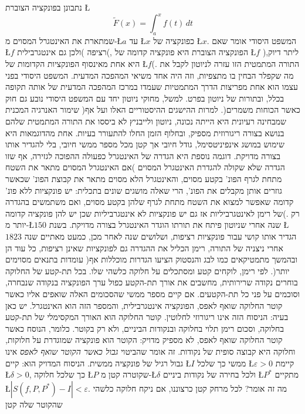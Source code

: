 \documentclass[english,hebrew]{article}
\theoremstyle{remark}
\theoremstyle{definition}
\theoremstyle{plain}
\theoremstyle{remark}
\theoremstyle{plain}
\theoremstyle{plain}
\theoremstyle{definition}
\theoremstyle{plain}
\begin{document}
נתבונן בפונקציה הצוברת \L{%
\[
\tilde{F}(x)=\int_{a}^{x}f(t)\,dt
\]
}%
שמתארת את האינטגרל המסוים מ-\L{$a$} עד \L{$x$} כפונקציה של \L{$x$}.
המשפט היסודי אומר שאם \L{$f$} רציפה )ולכן גם אינטגרבילית(, הפונקציה
הצוברת היא פונקציה קדומה של \L{$f$} )ליתר דיוק, היא אחת מאינסוף הפונקציות
הקדומות של \L{$f$}(. התורה המתמטית הזו עזרה לניוטון לקבל את מה שקפלר
הבחין בו מתצפיות, וזה היה אחד משיאי המהפכה המדעית. המשפט היסודי בפני
עצמו הוא אחת מפריצות הדרך המתמטיות שעמדו במרכז המהפכה המדעית של אותה
תקופה בכלל, ובתורות של ניוטון בפרט. למשל, מחוקי ניוטון יחד עם המשפט
היסודי נובע גם חוק שימור האנרגיה המכנית )כאשר הכוחות משמרים(. למרות
ההישגים ההיסטוריים האלו ועל אף שמבחינה רעיונית היא הייתה נכונה, ניוטון
ולייבניץ לא ביססו את התורה המתמטית שלהם בנושא בצורה ריגורוזית מספיק,
ובחלוף הזמן החלו להתעורר בעיות. אחת מהדוגמאות היא שימוש במושג אינפיניטסימל,
גודל חיובי אך קטן מכל מספר ממשי חיובי, בלי להגדיר אותו בצורה מדויקת.
דוגמה נוספת היא הגדרה של האינטגרל כפעולה ההפוכה לגזירה, אף שזו הגדרה
שלא שקולה להגדרת האינטגרל המסוים )אם האינטגרל המסוים מתאר את השטח
מתחת לגרף הפונ' בקטע מסוים, והאינטגרל הלא מסוים מתאר את קבוצת הפונ'
שכאשר גוזרים אותן מקבלים את הפונ', הרי שאלה מושגים שונים בתכלית: יש
פונקציות ללא פונ' קדומה שאפשר למצוא את השטח מתחת לגרף שלהן בקטע מסוים,
ואם משתמשים בהגדרה של רימן לאינטגרביליות אז גם יש פונקציות לא אינטגרביליות
שכן יש להן פונקציה קדומה(. רק יותר מ-\L{$150$} שנה אחרי שניוטון פיתח
את תורתו הוגדר האינטגרל בצורה מדויקת. בשנת \L{$1823$} הגדיר אותו
קושי עבור פונקציות רציפות, ושלושים שנה לאחר מכן, כמעט מאתיים שנה אחרי
ניצניה של התורה, רימן הכליל את ההגדרה גם לפונקציות שאינן רציפות, כל
עוד הן עומדות בתנאים מסוימים )ובהמשך מתמטיקאים כמו לבג והנסטוק הציעו
הגדרות מוכללות אף יותר(. לפי רימן, לוקחים קטע ומסתכלים על חלוקה כלשהי
שלו. בכל תת-קטע של החלוקה בוחרים נקודה שרירותית, מחשבים את אורך תת-הקטע
כפול ערך הפונקציה בנקודה שנבחרה, וסוכמים על פני כל תת-הקטעים. אם קיים
מספר ממשי שהסכומים האלה שואפים אליו כאשר קוטר החלוקה שואף לאפס, הפונקציה
אינטגרבילית, והמספר הזה הוא האינטגרל. יש כאן בעיה: הניסוח הזה אינו
ריגורוזי לחלוטין. קוטר החלוקה הוא האורך המקסימלי של תת-קטע בחלוקה,
וסכום רימן תלוי בחלוקה ובנקודות הביניים, ולא רק בקוטר. כלומר, הנוסח
כאשר קוטר החלוקה שואף לאפס, לא מספיק מדויק: הקוטר הוא פונקציה שמוגדרת
על חלוקות, וחלוקה היא קבוצה סופית של נקודות. זה אומר שהביטוי \emph{גבול
כאשר הקוטר שואף לאפס} אינו גבול רגיל של פונקציה ממשית. הניסוח המדויק
הוא: קיים \L{$I$} ממשי כך שלכל \L{$\varepsilon>0$} קיימת \L{$\delta>0$},
כך שלכל חלוקה \L{$P$} שקוטרה קטן מ-\L{$\delta$} ולכל בחירה של נקודות
ביניים \L{$P^{*}$} מתקיים \L{$\left|S\left(f,P,P^{*}\right)-I\right|<\varepsilon$}.
מה זה אומר? לכל מרחק קטן כרצוננו, אם ניקח חלוקה כלשהי שהקוטר שלה קטן
\end{document}
